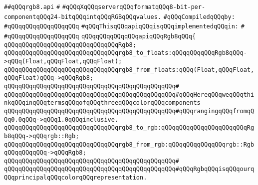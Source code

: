 \label{src/lib/x-kit/xclient/src/color/rgb8.api}
\verb|##qQQqrgb8.api|\newline
\verb|#|\newline
\verb|#qQQqXqQQqserverqQQqformatqQQq8-bit-per-componentqQQq24-bitqQQqintqQQqRGBqQQqvalues.|\newline
\newline
\verb|#qQQqCompiledqQQqby:|\newline
\verb|#qQQqqQQqqQQqqQQqqQQq|\newline
\newline
\verb|#qQQqThisqQQqapiqQQqisqQQqimplementedqQQqin:|\newline
\verb|#|\newline
\verb|#qQQqqQQqqQQqqQQqqQQq|\newline
\newline
\verb|qQQqqQQqqQQqqQQqapiqQQqRgb8qQQq{|\newline
\newline
\verb|qQQqqQQqqQQqqQQqqQQqqQQqqQQqqQQqRgb8;|\newline
\newline
\verb|qQQqqQQqqQQqqQQqqQQqqQQqqQQqqQQqrgb8_to_floats:qQQqqQQqqQQqRgb8qQQq->qQQq(Float,qQQqFloat,qQQqFloat);|\newline
\verb|qQQqqQQqqQQqqQQqqQQqqQQqqQQqqQQqrgb8_from_floats:qQQq(Float,qQQqFloat,qQQqFloat)qQQq->qQQqRgb8;|\newline
\verb|qQQqqQQqqQQqqQQqqQQqqQQqqQQqqQQqqQQqqQQqqQQqqQQq#|\newline
\verb|qQQqqQQqqQQqqQQqqQQqqQQqqQQqqQQqqQQqqQQqqQQqqQQq#qQQqHereqQQqweqQQqthinkqQQqinqQQqtermsqQQqofqQQqthreeqQQqcolorqQQqcomponents|\newline
\verb|qQQqqQQqqQQqqQQqqQQqqQQqqQQqqQQqqQQqqQQqqQQqqQQq#qQQqrangingqQQqfromqQQq0.0qQQq->qQQq1.0qQQqinclusive.|\newline
\newline
\verb|qQQqqQQqqQQqqQQqqQQqqQQqqQQqqQQqrgb8_to_rgb:qQQqqQQqqQQqqQQqqQQqqQQqRgb8qQQq->qQQqrgb::Rgb;|\newline
\verb|qQQqqQQqqQQqqQQqqQQqqQQqqQQqqQQqrgb8_from_rgb:qQQqqQQqqQQqqQQqrgb::RgbqQQqqQQqqQQq->qQQqRgb8;|\newline
\verb|qQQqqQQqqQQqqQQqqQQqqQQqqQQqqQQqqQQqqQQqqQQqqQQq#|\newline
\verb|qQQqqQQqqQQqqQQqqQQqqQQqqQQqqQQqqQQqqQQqqQQqqQQq#qQQqRgbqQQqisqQQqourqQQqprincipalqQQqcolorqQQqrepresentation.|\newline
